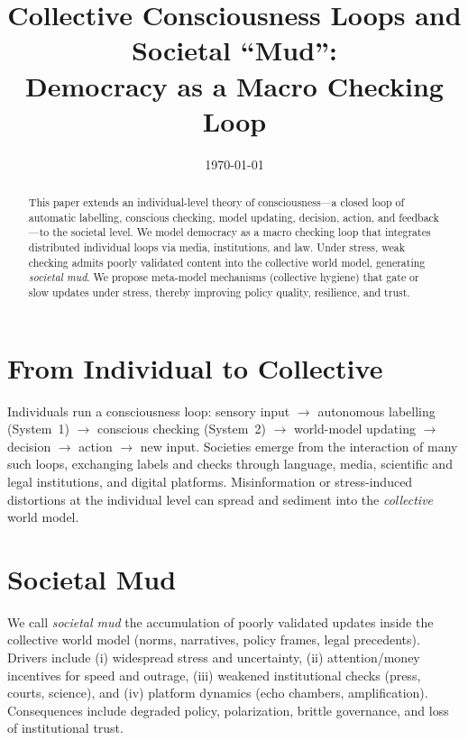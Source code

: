 \documentclass[11pt,a4paper]{article}
\title{\textbf{Collective Consciousness Loops and Societal ``Mud'':\\
Democracy as a Macro Checking Loop}}
\author{}
\date{\today}
\begin{document}
\maketitle
\onehalfspacing

\begin{abstract}
This paper extends an individual-level theory of consciousness---a closed loop of automatic labelling, conscious checking, model updating, decision, action, and feedback---to the societal level. We model democracy as a macro checking loop that integrates distributed individual loops via media, institutions, and law. Under stress, weak checking admits poorly validated content into the collective world model, generating \emph{societal mud}. We propose meta-model mechanisms (collective hygiene) that gate or slow updates under stress, thereby improving policy quality, resilience, and trust.
\end{abstract}

\section{From Individual to Collective}
Individuals run a consciousness loop: sensory input $\rightarrow$ autonomous labelling (System~1) $\rightarrow$ conscious checking (System~2) $\rightarrow$ world-model updating $\rightarrow$ decision $\rightarrow$ action $\rightarrow$ new input.
Societies emerge from the interaction of many such loops, exchanging labels and checks through language, media, scientific and legal institutions, and digital platforms.
Misinformation or stress-induced distortions at the individual level can spread and sediment into the \emph{collective} world model.

\section{Societal Mud}
We call \emph{societal mud} the accumulation of poorly validated updates inside the collective world model (norms, narratives, policy frames, legal precedents).
Drivers include (i) widespread stress and uncertainty, (ii) attention/money incentives for speed and outrage, (iii) weakened institutional checks (press, courts, science), and (iv) platform dynamics (echo chambers, amplification).
Consequences include degraded policy, polarization, brittle governance, and loss of institutional trust.
\end{document}
